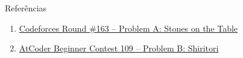 \begin{frame}[fragile]{Referências}

    \begin{enumerate}
        \item \href{https://codeforces.com/problemset/problem/266/A}{Codeforces Round \#163 -- Problem A: Stones on the Table}

        \item \href{https://atcoder.jp/contests/abc109/tasks/abc109\_b}{AtCoder Beginner Contest 109 -- Problem B: Shiritori}

    \end{enumerate}

\end{frame}

